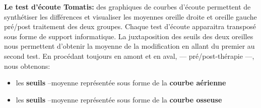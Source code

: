 \textbf{Le test d'écoute Tomatis: }
des graphiques de courbes d'écoute permettent  de synthétiser les différences et visualiser les 
moyennes oreille droite et oreille gauche pré/post 
traitement des 
deux groupes. Chaque test d'écoute  apparaitra transposé  sous forme de support informatique.
 La juxtaposition des seuils des deux oreilles nous permettent d'obtenir la moyenne de la 
 modification en allant du 
 premier au second test.
En procédant toujours en amont et en aval, --- pré/post-thérapie ---, nous
obtenons:
\begin{itemize}
	\item   les \textbf{seuils}  --moyenne
	représentée sous forme de la  \textbf{courbe aérienne}
	\item   les \textbf{seuils} --moyenne
	représentée sous forme de la \textbf{courbe osseuse}
\end{itemize}


